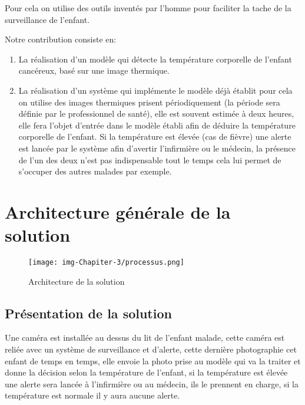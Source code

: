 \documentclass[12pt]{article}
\begin{document}
Pour cela on utilise des outils inventés par l'homme pour faciliter la tache de la surveillance de l'enfant.

Notre contribution consiste en:
\begin{enumerate}
	\item La réalisation d'un modèle qui détecte la température corporelle de l'enfant cancéreux, basé sur une image thermique.
	\item La réalisation d'un système qui implémente le modèle déjà établit pour cela on utilise des images thermiques prisent périodiquement (la période sera définie par le professionnel de santé), elle est souvent estimée à deux heures, elle fera l’objet d’entrée dans le modèle établi afin de déduire la température corporelle de l’enfant.
	Si la température est élevée (cas de fièvre) une alerte est lancée par le système afin d’avertir l'infirmière ou le médecin, la présence de l'un des deux n'est pas indispensable tout le temps cela lui permet de s’occuper des autres malades par exemple.
\end{enumerate}

\section{Architecture générale de la solution}
\begin{figure}[h]
	\centering
	\texttt{[image: img-Chapiter-3/processus.png]}
	\caption{Architecture de la solution}
	\label{fig:archgene}
\end{figure}
\newpage
\subsection{Présentation de la solution}
Une caméra est installée au dessus du lit de l'enfant malade, cette caméra est reliée avec un système de surveillance et d'alerte, cette dernière photographie cet enfant de temps en temps, elle envoie la photo prise au modèle qui va la traiter et donne la décision selon la température de l'enfant, si la température est élevée une alerte sera lancée à l'infirmière ou au médecin, ils le prennent en charge, si la température est normale il y aura aucune alerte.
\end{document}
